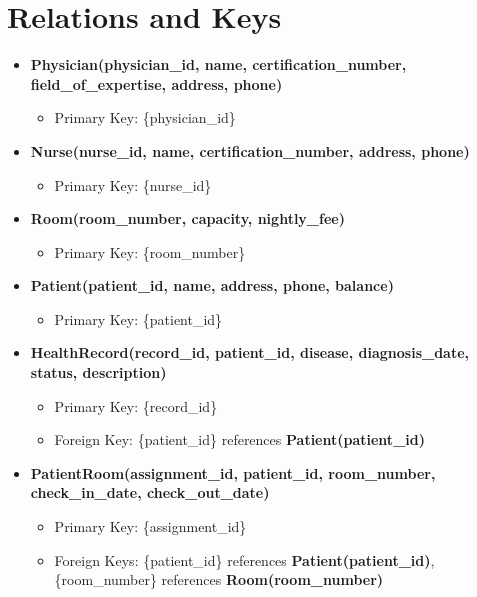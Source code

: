 \documentclass{article}
\begin{document}
\section{Relations and Keys}
\begin{itemize}
    \item \textbf{Physician(physician\_id, name, certification\_number, field\_of\_expertise, address, phone)}
        \begin{itemize}
            \item Primary Key: \{physician\_id\}
        \end{itemize}
    \item \textbf{Nurse(nurse\_id, name, certification\_number, address, phone)}
        \begin{itemize}
            \item Primary Key: \{nurse\_id\}
        \end{itemize}
    \item \textbf{Room(room\_number, capacity, nightly\_fee)}
        \begin{itemize}
            \item Primary Key: \{room\_number\}
        \end{itemize}
    \item \textbf{Patient(patient\_id, name, address, phone, balance)}
        \begin{itemize}
            \item Primary Key: \{patient\_id\}
        \end{itemize}
    \item \textbf{HealthRecord(record\_id, patient\_id, disease, diagnosis\_date, status, description)}
        \begin{itemize}
            \item Primary Key: \{record\_id\}
            \item Foreign Key: \{patient\_id\} references \textbf{Patient(patient\_id)}
        \end{itemize}
    \item \textbf{PatientRoom(assignment\_id, patient\_id, room\_number, check\_in\_date, check\_out\_date)}
        \begin{itemize}
            \item Primary Key: \{assignment\_id\}
            \item Foreign Keys: \{patient\_id\} references \textbf{Patient(patient\_id)}, \{room\_number\} references \textbf{Room(room\_number)}
        \end{itemize}

\end{itemize}
\end{document}
